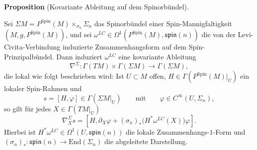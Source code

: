 \documentclass[10pt, letterpaper]{article}
\newcommand{\End}{\mathrm{End}}
\newcommand{\Spin}{\mathrm{Spin}}
\newcommand{\CustomHeading}[3]{%
  \par\medskip\noindent%
  \textbf{#1 #2} \textnormal{(#3)}.\enskip%
}
\newenvironment{PROP}[2]{\CustomHeading{Proposition}{#1}{#2}}{}
\begin{document}
\begin{PROP}{}{Kovariante Ableitung auf dem Spinorbündel}
Sei $\Sigma M= P^\Spin(M)\times_{\sigma_n}\Sigma_n$ das Spinorbündel einer Spin-Mannigfaltigkeit \((M,g,P^\Spin(M))\), und sei $\omega^{LC}\in \Omega^1(P^\Spin(M),\mathfrak{spin}(n))$ die von der Levi-Civita-Verbindung induzierte Zusammenhangsform auf dem Spin-Prinzipalbündel. Dann induziert \(\omega^{LC}\) eine kovariante Ableitung
\[
\nabla^\Sigma:\Gamma(TM)\times \Gamma(\Sigma M)\to \Gamma(\Sigma M),
\]
die lokal wie folgt beschrieben wird: Ist \(U\subset M\) offen, \(H\in \Gamma(P^\Spin(M)|_U)\) ein lokaler Spin-Rahmen und
\[
s=[H,\varphi]\in \Gamma(\Sigma M|_U)
\qquad\text{mit}\qquad
\varphi\in C^\infty(U,\Sigma_n),
\]
so gilt für jedes \(X\in \Gamma(TM|_U)\)
\[
\nabla_X^\Sigma s
=
\left[H,\partial_X\varphi+(\sigma_n)_*\bigl(H^*\omega^{LC}(X)\bigr)\varphi\right].
\]
Hierbei ist $H^*\omega^{LC}\in \Omega^1(U,\mathfrak{spin}(n))$ die lokale Zusammenhangs-\(1\)-Form und $(\sigma_n)_*:\mathfrak{spin}(n)\to \End(\Sigma_n)$ die abgeleitete Darstellung.
\end{PROP}
\end{document}
